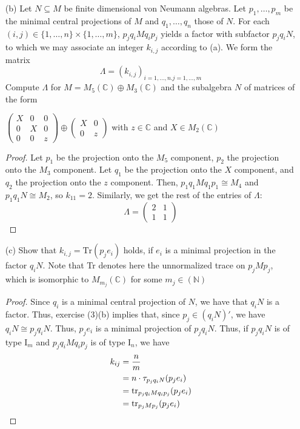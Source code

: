 \documentclass{article}
\begin{document}
\begin{enumerate}
		\item[(b)] Let $ N \subseteq M $ be finite dimensional von Neumann algebras. Let $ p_1,\ldots, p_m $ be the minimal central projections of $ M $ and 
		$ q_1,\ldots, q_n $ those of $ N $. For each $ (i, j) \in	\{1, \ldots , n\} \times \{1,\ldots, m\} $, $ p_jq_iMq_ip_j $ yields a factor with subfactor $ p_jq_iN $, to which we may associate an integer $ k_{i,j} $ according to (a). We form the matrix
			\[\Lambda=(k_{i,j})_{i=1,\ldots,n. j=1,\ldots, m}\]
			Compute $ \Lambda $ for $ M=M_5(\mathbb{C})\oplus M_3(\mathbb{C})$ and the subalgebra $ N $ of matrices of the form 
			
	\begin{center}
		$\begin{pmatrix}X & 0& 0\\
		0& X & 0\\
		0&0&z
		\end{pmatrix}\oplus \begin{pmatrix}
		X&0\\
		0&z
		\end{pmatrix}$ with $ z\in \mathbb{C} $ and $ X\in M_2(\mathbb{C}) $
	\end{center}

		
	\begin{proof}
          Let $p_1$ be the projection onto the $M_5$ component, $p_2$ the projection onto the $M_3$ component.  Let $q_1$ be the projection onto the $X$ component, and $q_2$ the projection onto the $z$ component.   Then, $p_1q_1 M q_1 p_1 \cong M_4$ and $p_1 q_1 N \cong M_2$, so $k_{11} = 2$.  Similarly, we get the rest of the entries of $\Lambda$:
          $$\Lambda = \begin{pmatrix}
            2 & 1 \\
            1 & 1
          \end{pmatrix}
          $$
	
\end{proof}

    \item[(c)] Show that $ k_{i,j} = \text{Tr}(p_je_i)$ holds, if $ e_i $ is a minimal projection in the factor $ q_iN $. Note that Tr denotes here the unnormalized trace on $ p_jMp_j $, which is isomorphic to $ M_{m_j}(\mathbb{C}) $ for some $ m_j\in \mathbb{(N)} $    		
      \begin{proof}
        Since $q_i$ is a minimal central projection of $N$, we have that $q_iN$ is a factor.  Thus, exercise (3)(b) implies that, since $p_j \in (q_i N)'$, we have $q_i N \cong p_j q_i N$.  Thus, $p_j e_i$ is a minimal projection of $p_j q_i N$.  Thus,
        if $p_j q_i N$ is of type I$_m$ and $p_j q_i M q_i p_j$ is of type I$_n$, we have
        \begin{align*}
          k_{ij} & = \frac{n}{m} \\
          & = n \cdot \tau_{p_j q_i N}(p_j e_i) \\
          & = \operatorname{tr}_{p_j q_i M q_i p_j}(p_j e_i) \\
          & = \operatorname{tr}_{p_j M p_j}(p_j e_i) \\
        \end{align*}
    	
      \end{proof}
\end{enumerate}
	
\end{document}

